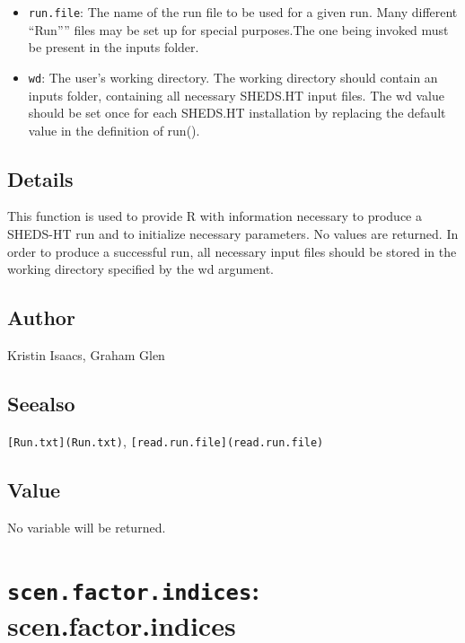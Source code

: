 \documentclass[
]{article}
\providecommand{\tightlist}{%
  \setlength{\itemsep}{0pt}\setlength{\parskip}{0pt}}
\begin{document}
\begin{itemize}
\tightlist
\item
  \texttt{run.file}: The name of the run file to be used for a given
  run. Many different ``Run'''' files may be set up for special
  purposes.The one being invoked must be present in the inputs folder.
\item
  \texttt{wd}: The user's working directory. The working directory
  should contain an inputs folder, containing all necessary SHEDS.HT
  input files. The wd value should be set once for each SHEDS.HT
  installation by replacing the default value in the definition of
  run().
\end{itemize}

\hypertarget{details-25}{%
\subsection{Details}\label{details-25}}

This function is used to provide R with information necessary to produce
a SHEDS-HT run and to initialize necessary parameters. No values are
returned. In order to produce a successful run, all necessary input
files should be stored in the working directory specified by the wd
argument.

\hypertarget{author-27}{%
\subsection{Author}\label{author-27}}

Kristin Isaacs, Graham Glen

\hypertarget{seealso-21}{%
\subsection{Seealso}\label{seealso-21}}

\texttt{{[}Run.txt{]}(Run.txt)},
\texttt{{[}read.run.file{]}(read.run.file)}

\hypertarget{value-30}{%
\subsection{Value}\label{value-30}}

No variable will be returned.

\hypertarget{scen.factor.indices-scen.factor.indices}{%
\section{\texorpdfstring{\texttt{scen.factor.indices}:
scen.factor.indices}{scen.factor.indices: scen.factor.indices}}\label{scen.factor.indices-scen.factor.indices}}
\end{document}
